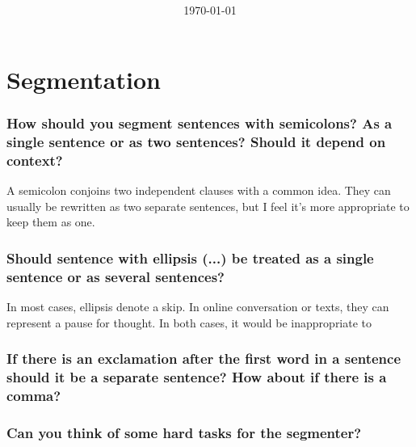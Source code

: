 \documentclass[fleqn]{article}
\title{
	\vspace{2in}
	\textmd{\textbf{\hmwkClass\ \hmwkTitle}}\\
	\large{\hmwkClassInstructor}\\
	\vspace{3in}
}
\author{\textbf{\hmwkAuthorName}}
\date{\today} %
\begin{document}
	\maketitle


\newpage
\newpage
\section{Segmentation}
\subsubsection{How should you segment sentences with semicolons? As a single sentence or as two sentences? Should it depend on context?}
A semicolon conjoins two independent clauses with a common idea. They can usually be rewritten as two separate sentences, but I feel it's more appropriate to keep them as one.

\subsubsection{Should sentence with ellipsis (...) be treated as a single sentence or as several sentences?}
In most cases, ellipsis denote a skip. In online conversation or texts, they can represent a pause for thought. In both cases, it would be inappropriate to 

\subsubsection{If there is an exclamation after the first word in a sentence should it be a separate sentence? How about if there is a comma?}

\subsubsection{Can you think of some hard tasks for the segmenter?}

\end{document}
